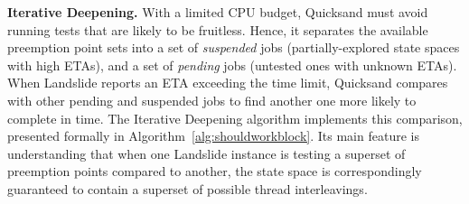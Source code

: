 {\bf Iterative Deepening.}
With a limited CPU budget, Quicksand must avoid running tests that are likely to be fruitless.
Hence, it separates the available preemption point sets into a set of {\em suspended} jobs (partially-explored state spaces with high ETAs),
and a set of {\em pending} jobs (untested ones with unknown ETAs).
When Landslide reports an ETA exceeding the time limit,
Quicksand compares with other pending and suspended jobs to find another one more likely to complete in time.
The Iterative Deepening algorithm implements this comparison, presented formally in Algorithm~\ref{alg:shouldworkblock}.
Its main feature is understanding that when one Landslide instance is testing a superset of preemption points compared to another, the state space is correspondingly guaranteed to contain a superset of possible thread interleavings.

